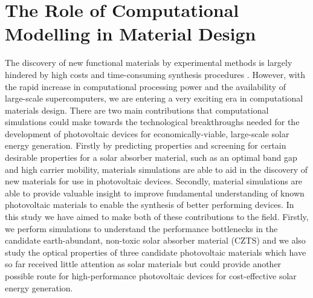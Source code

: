 \section{The Role of Computational Modelling in Material Design}
The discovery of new functional materials by experimental methods is largely hindered by high costs and time-consuming synthesis procedures \cite{high_tp}.
However, with the rapid increase in computational processing power and the availability of large-scale supercomputers, we are entering a very exciting era in computational materials design. 
There are two main contributions that computational simulations could make towards the technological breakthroughs needed for the development of photovoltaic devices for economically-viable, large-scale solar energy generation. Firstly by predicting properties and screening for certain desirable properties for a solar absorber material, such as an optimal band gap and high carrier mobility, materials simulations are able to aid in the discovery of new materials for use in photovoltaic devices. Secondly, material simulations are able to provide valuable insight to improve fundamental understanding of known photovoltaic materials to enable the synthesis of better performing devices. In this study we have aimed to make both of these contributions to the field. Firstly, we perform simulations to understand the performance bottlenecks in the candidate earth-abundant, non-toxic solar absorber material {\CZTS} (CZTS) and we also study the optical properties of three candidate photovoltaic materials which have so far received little attention as solar materials but could provide another possible route for high-performance photovoltaic devices for cost-effective solar energy generation.